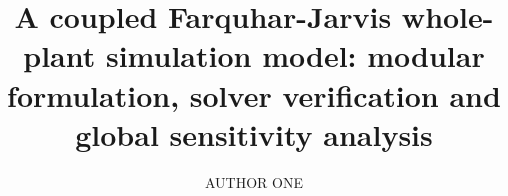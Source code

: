 \documentclass[a4paper,fleqn]{cas-sc}
\begin{document}
\let\WriteBookmarks\relax
\def\floatpagepagefraction{1}
\def\textpagefraction{.001}


\shortauthors{}

\title [mode = title]{A coupled Farquhar-Jarvis whole-plant simulation
model: modular formulation, solver verification and global sensitivity
analysis}



%

\author[1]{AUTHOR ONE}%

\cormark[1]




\end{document}
